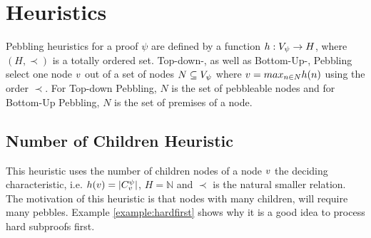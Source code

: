 \documentclass{llncs}
\begin{document}
\section{Heuristics}
\label{sec:heuristics}
Pebbling heuristics for a proof $\psi$ are defined by a function $h: V_{\psi} \rightarrow H$, where $(H,\prec)$ is a totally ordered set. 
Top-down-, as well as Bottom-Up-, Pebbling select one node $v$ out of a set of nodes $N \subseteq V_{\psi}$ where $v = max_{n \in N} h(n)$ using the order $\prec$.
For Top-down Pebbling, $N$ is the set of pebbleable nodes and for Bottom-Up Pebbling, $N$ is the set of premises of a node.

\subsection{Number of Children Heuristic}
\label{sec:children}
This heuristic uses the number of children nodes of a node $v$ the deciding characteristic, i.e. $h(v) = |C_{v}^{\psi}|$, $H = \mathbb{N}$ and $\prec$ is the natural smaller relation.\\
The motivation of this heuristic is that nodes with many children, will require many pebbles. Example \ref{example:hardfirst} shows why it is a good idea to process hard subproofs first.
\end{document}
